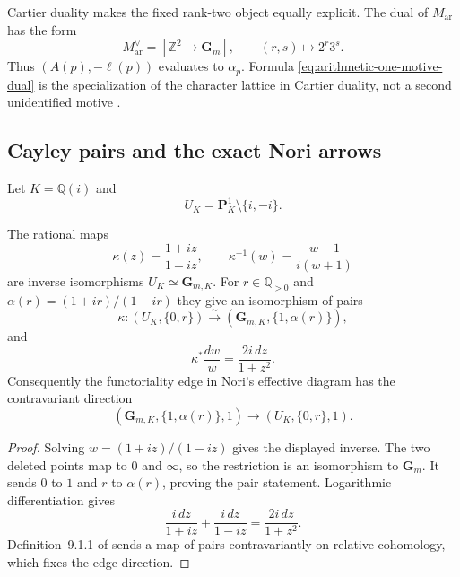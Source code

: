 Cartier duality makes the fixed rank-two object equally explicit.  The dual
of $M_{\mathrm{ar}}$ has the form
\begin{equation}
\label{eq:arithmetic-one-motive-dual}
 M_{\mathrm{ar}}^\vee=
 [\mathbb Z^2\longrightarrow\mathbf G_m],
 \qquad (r,s)\longmapsto2^r3^s.
\end{equation}
Thus $(A(p),-\ell(p))$ evaluates to $\alpha_p$.  Formula
\eqref{eq:arithmetic-one-motive-dual} is the specialization of the character
lattice in Cartier duality, not a second unidentified motive
\cite[Section~1.8]{BarbieriVialeKahn2016}.

\subsection{Cayley pairs and the exact Nori arrows}

Let $K=\mathbb Q(i)$ and
\[
 U_K=\mathbf P^1_K\setminus\{i,-i\}.
\]

\begin{theorem}
\label{thm:cayley-pair-isomorphism}
The rational maps
\begin{equation}
\label{eq:cayley-map-and-inverse}
 \kappa(z)=\frac{1+iz}{1-iz},
 \qquad
 \kappa^{-1}(w)=\frac{w-1}{i(w+1)}
\end{equation}
are inverse isomorphisms $U_K\simeq\mathbf G_{m,K}$.  For
$r\in\mathbb Q_{>0}$ and
$\alpha(r)=(1+ir)/(1-ir)$ they give an isomorphism of pairs
\begin{equation}
\label{eq:cayley-pair-map}
 \kappa:(U_K,\{0,r\})\overset{\sim}{\longrightarrow}
 (\mathbf G_{m,K},\{1,\alpha(r)\}),
\end{equation}
and
\begin{equation}
\label{eq:cayley-differential}
 \kappa^*\frac{dw}{w}=\frac{2i\,dz}{1+z^2}.
\end{equation}
Consequently the functoriality edge in Nori's effective diagram has the
contravariant direction
\begin{equation}
\label{eq:cayley-nori-edge}
 (\mathbf G_{m,K},\{1,\alpha(r)\},1)\longrightarrow
 (U_K,\{0,r\},1).
\end{equation}
\end{theorem}

\begin{proof}
Solving $w=(1+iz)/(1-iz)$ gives the displayed inverse.  The two deleted
points map to $0$ and $\infty$, so the restriction is an isomorphism to
$\mathbf G_m$.  It sends $0$ to $1$ and $r$ to $\alpha(r)$, proving the
pair statement.  Logarithmic differentiation gives
\[
 \frac{i\,dz}{1+iz}+\frac{i\,dz}{1-iz}
 =\frac{2i\,dz}{1+z^2}.
\]
Definition~9.1.1 of \cite{HuberMullerStach2025} sends a map of pairs
contravariantly on relative cohomology, which fixes the edge direction.
\end{proof}


